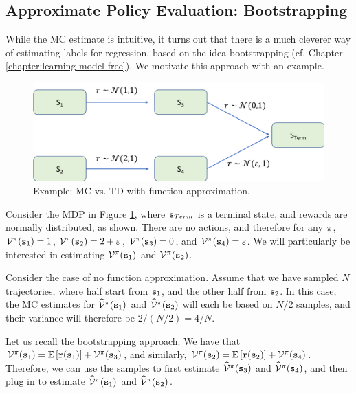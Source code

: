 
\subsection{Approximate Policy Evaluation: Bootstrapping}\label{ssec:APE_bootstrapping}
While the MC estimate is intuitive, it turns out that there is a much cleverer way of estimating labels for regression, based on the idea bootstrapping (cf. Chapter \ref{chapter:learning-model-free}). We motivate this approach with an example.

\begin{figure}
    \centering
    \includegraphics[width=\textwidth]{figures/td_vs_mc_FA.png}
    \caption{Example: MC vs. TD with function approximation.}
    \label{fig:td_vs_mc_FA}
\end{figure}

Consider the MDP in Figure \ref{fig:td_vs_mc_FA}, where ${\tt s}_{Term}$ is a terminal state, and rewards are normally distributed, as shown. There are no actions, and therefore for any $\pi$, $\mathcal{V}^{\pi}({\tt s}_1) = 1$, $\mathcal{V}^{\pi}({\tt s}_2) = 2+\varepsilon$, $\mathcal{V}^{\pi}({\tt s}_3) = 0$, and $\mathcal{V}^{\pi}({\tt s}_4) = \varepsilon$. We will particularly be interested in estimating $\mathcal{V}^{\pi}({\tt s}_1)$ and $\mathcal{V}^{\pi}({\tt s}_2)$.

Consider the case of no function approximation. Assume that we have sampled $N$ trajectories, where half start from ${\tt s}_1$, and the other half from ${\tt s}_2$. In this case, the MC estimates for $\widehat{\mathcal{V}}^{\pi}({\tt s}_1)$ and $\widehat{\mathcal{V}}^{\pi}({\tt s}_2)$ will each be based on $N/2$ samples, and their variance will therefore be $2 / ({N}/{2}) = 4/{N}$.

Let us recall the bootstrapping approach. We have that $\mathcal{V}^{\pi}({\tt s}_1) = \mathbb{E}\left[ {\tt r}({\tt s}_1)\right] + \mathcal{V}^{\pi}({\tt s}_3)$, and similarly, $\mathcal{V}^{\pi}({\tt s}_2) = \mathbb{E}\left[ {\tt r}({\tt s}_2)\right] + \mathcal{V}^{\pi}({\tt s}_4)$. Therefore, we can use the samples to first estimate $\widehat{\mathcal{V}}^{\pi}({\tt s}_3)$ and $\widehat{\mathcal{V}}^{\pi}({\tt s}_4)$, and then plug in to estimate $\widehat{\mathcal{V}}^{\pi}({\tt s}_1)$ and $\widehat{\mathcal{V}}^{\pi}({\tt s}_2)$.

